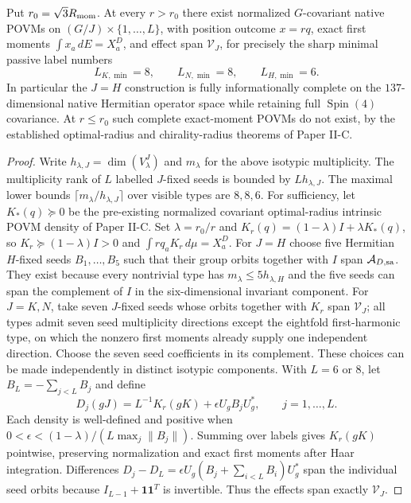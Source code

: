 \documentclass[12pt,a4paper]{article}
\begin{document}
\begin{theorem}
\label{p2c:thm:covariant-direction-complete-povm}
Put $r_0=\sqrt3R_{\rm mom}$. At every $r>r_0$ there exist normalized
$G$-covariant native POVMs on
$(G/J)\times\{1,\ldots,L\}$, with position outcome $x=rq$,
exact first moments $\int x_a\,dE=X_a^D$, and effect span
$\mathcal V_J$, for precisely the sharp minimal passive label numbers
\[
 \boxed{L_{K,\min}=8,\qquad L_{N,\min}=8,\qquad L_{H,\min}=6.}
\]
In particular the $J=H$ construction is fully informationally complete
on the $137$-dimensional native Hermitian operator space while retaining
full $\operatorname{Spin}(4)$ covariance. At $r\le r_0$ such complete
exact-moment POVMs do not exist, by the established optimal-radius and
chirality-radius theorems of Paper II-C.
\end{theorem}
\begin{proof}
Write $h_{\lambda,J}=\dim(V_\lambda^J)$ and $m_\lambda$ for the above
isotypic multiplicity. The multiplicity rank of $L$ labelled $J$-fixed
seeds is bounded by $Lh_{\lambda,J}$. The maximal lower bounds
$\lceil m_\lambda/h_{\lambda,J}\rceil$ over visible types are $8,8,6$.
For sufficiency, let $K_*(q)\succeq0$ be the pre-existing normalized
covariant optimal-radius intrinsic POVM density of Paper II-C. Set
$\lambda=r_0/r$ and
$K_r(q)=(1-\lambda)I+\lambda K_*(q)$, so
$K_r\succeq(1-\lambda)I>0$ and
$\int rq_aK_r\,d\mu=X_a^D$.
For $J=H$ choose five Hermitian $H$-fixed seeds $B_1,\ldots,B_5$
such that their group orbits together with $I$ span $\mathcal A_{D,\rm sa}$.
They exist because every nontrivial type has
$m_\lambda\le5h_{\lambda,H}$ and the five seeds can span the complement
of $I$ in the six-dimensional invariant component. For $J=K,N$, take
seven $J$-fixed seeds whose orbits together with $K_r$ span $\mathcal V_J$;
all types admit seven seed multiplicity directions except the eightfold
first-harmonic type, on which the nonzero first moments already supply
one independent direction. Choose the seven seed coefficients in its
complement. These choices can be made independently in distinct
isotypic components.
With $L=6$ or $8$, let $B_L=-\sum_{j<L}B_j$ and define
\[
 D_j(gJ)=L^{-1}K_r(gK)+\epsilon U_gB_jU_g^*,\qquad j=1,\ldots,L.
\]
Each density is well-defined and positive when
$0<\epsilon<(1-\lambda)/(L\max_j\|B_j\|)$.
Summing over labels gives $K_r(gK)$ pointwise, preserving normalization
and exact first moments after Haar integration. Differences
$D_j-D_L=\epsilon U_g(B_j+\sum_{i<L}B_i)U_g^*$ span the individual
seed orbits because $I_{L-1}+\mathbf1\mathbf1^T$ is invertible.
Thus the effects span exactly $\mathcal V_J$.
\end{proof}
\end{document}
